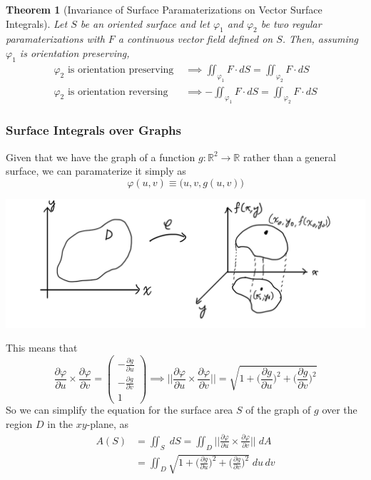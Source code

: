 \documentclass{article}
\newtheorem{theorem}{Theorem}[section]
\theoremstyle{remark}
\theoremstyle{definition}
\begin{document}
\begin{theorem}[Invariance of Surface Paramaterizations on Vector Surface Integrals]
Let $S$ be an oriented surface and let $\varphi_1$ and $\varphi_2$ be two regular paramaterizations with $F$ a continuous vector field defined on $S$. Then, assuming $\varphi_1$ is orientation preserving, 
\begin{align*}
    \varphi_2 \text{ is orientation preserving } & \implies \iint_{\varphi_1} F \cdot d S = \iint_{\varphi_2} F \cdot d S \\
    \varphi_2 \text{ is orientation reversing } & \implies - \iint_{\varphi_1} F \cdot d S = \iint_{\varphi_2} F \cdot d S 
\end{align*}
\end{theorem}

\subsubsection{Surface Integrals over Graphs}
Given that we have the graph of a function $g: \mathbb{R}^2 \longrightarrow \mathbb{R}$ rather than a general surface, we can paramaterize it simply as
\[\varphi(u, v) \equiv \big(u, v, g(u, v) \big)\]
\begin{center}
    \includegraphics[scale=0.25]{img/Paramaterize_Surfaces_as_Graphs.PNG}
\end{center}
This means that 
\[\frac{\partial \varphi}{\partial u} \times \frac{\partial \varphi}{\partial v} = 
\begin{pmatrix}
-\frac{\partial g}{\partial u} \\ -\frac{\partial g}{\partial v} \\ 1
\end{pmatrix} \implies \bigg|\bigg|\frac{\partial \varphi}{\partial u} \times \frac{\partial \varphi}{\partial v} \bigg|\bigg| = \sqrt{1 + \Big(\frac{\partial g}{\partial u}\Big)^2 + \Big( \frac{\partial g}{\partial v}\Big)^2}\]
So we can simplify the equation for the surface area $S$ of the graph of $g$ over the region $D$ in the $x y$-plane, as 
\begin{align*}
    A(S) & = \iint_S \; d S = \iint_D \bigg|\bigg|\frac{\partial \varphi}{\partial u} \times \frac{\partial \varphi}{\partial v} \bigg|\bigg| \; d A \\
    & = \iint_D \sqrt{1 + \Big(\frac{\partial g}{\partial u}\Big)^2 + \Big( \frac{\partial g}{\partial v}\Big)^2} \; d u \, d v
\end{align*}
\end{document}
